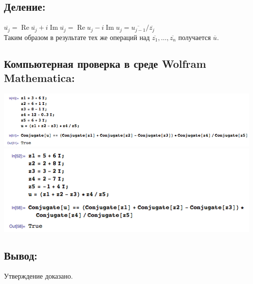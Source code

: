 \subsection{Деление:}
$
	\overline{u_j}
	=
	\operatorname{Re} \overline{u_j} + i \operatorname{Im} \overline{u_j}
	=
	\operatorname{Re} u_j - i \operatorname{Im} u_j
	=
	\overline{u_{j-1}} / \overline{z_j}
$
\\[2em]
Таким образом в результате тех же операций над $ \overline{z_1}, \dots, \overline{z_n} $ получается $ \overline{u} $.
\subsection{Компьютерная проверка в среде Wolfram Mathematica:}
\includegraphics[scale=0.6]{task/2_08/screen1.png}
\\
\includegraphics[scale=0.6]{task/2_08/screen2.png}
\subsection{Вывод:}
Утверждение доказано.
